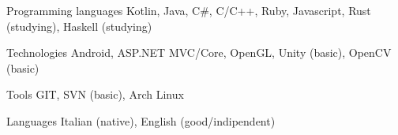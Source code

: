 

\begin{cvskills}

  \cvskill
    {Programming languages} %
    {Kotlin, Java, C\#, C/C++, Ruby, Javascript, Rust (studying), Haskell (studying)} %

  \cvskill
    {Technologies} %
    {Android, ASP.NET MVC/Core, OpenGL, Unity (basic), OpenCV (basic)} %

  \cvskill
    {Tools} %
    {GIT, SVN (basic), Arch Linux} %

  \cvskill
    {Languages} %
    {Italian (native), English (good/indipendent)} %

\end{cvskills}
